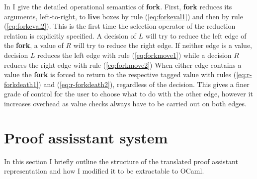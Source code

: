\documentclass[12pt,twoside,notitlepage]{report}
\theoremstyle{plain}%
\theoremstyle{definition}
\theoremstyle{remark}
\begin{document}

In  I give the detailed operational semantics of \textbf{fork}. First, \textbf{fork} reduces its arguments, left-to-right, to \textbf{live} boxes by rule (\ref{eq:forkeval1}) and then by rule (\ref{eq:forkeval2}). This is the first time the selection operator of the reduction relation is explicitly specified. A decision of $ L $ will try to reduce the left edge of the \textbf{fork}, a value of $ R $ will try to reduce the right edge. If neither edge is a value, decision $ L $ reduces the left edge with rule (\ref{eq:forkmove1}) while a decision $ R $ reduces the right edge with rule (\ref{eq:forkmove2}) When either edge contains a value the \textbf{fork} is forced to return to the respective tagged value with rules (\ref{eq:r-forkdeath1}) and (\ref{eq:r-forkdeath2}), regardless of the decision. This gives a finer grade of control for the user to choose what to do with the other edge, however it increases overhead as value checks always have to be carried out on both edges.   \clearpage
\section{Proof assisstant system}
In this section I briefly outline the structure of the translated proof assistant representation and how I modified it to be extractable to OCaml. 
\end{document}
